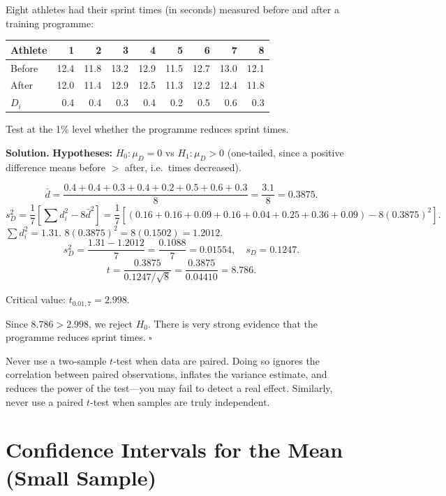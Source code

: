 \documentclass[12pt, a4paper, oneside]{book}
\theoremstyle{definition}
\theoremstyle{plain}
\theoremstyle{remark}
\newenvironment{solution}
  {\par\medskip\noindent\textbf{Solution.}\quad}
  {\hfill$\square$\par\medskip}
\begin{document}
\begin{workedexample}
Eight athletes had their sprint times (in seconds) measured before and after
a training programme:
\begin{center}
\begin{tabular}{lrrrrrrrr}
\toprule
Athlete & 1 & 2 & 3 & 4 & 5 & 6 & 7 & 8 \\
\midrule
Before  & 12.4 & 11.8 & 13.2 & 12.9 & 11.5 & 12.7 & 13.0 & 12.1 \\
After   & 12.0 & 11.4 & 12.9 & 12.5 & 11.3 & 12.2 & 12.4 & 11.8 \\
$D_i$   & 0.4  & 0.4  & 0.3  & 0.4  & 0.2  & 0.5  & 0.6  & 0.3  \\
\bottomrule
\end{tabular}
\end{center}
Test at the 1\% level whether the programme reduces sprint times.

\begin{solution}
\textbf{Hypotheses:} $H_0:\mu_D=0$ vs $H_1:\mu_D>0$ (one-tailed, since a
positive difference means before $>$ after, i.e.\ times decreased).

\[
  \bar{d} = \frac{0.4+0.4+0.3+0.4+0.2+0.5+0.6+0.3}{8} = \frac{3.1}{8} = 0.3875.
\]
\[
  s_D^2 = \frac{1}{7}\left[\sum d_i^2 - 8\bar{d}^2\right]
  = \frac{1}{7}\left[(0.16+0.16+0.09+0.16+0.04+0.25+0.36+0.09) - 8(0.3875)^2\right].
\]
$\sum d_i^2 = 1.31$.  $8(0.3875)^2 = 8(0.1502) = 1.2012$.
\[
  s_D^2 = \frac{1.31-1.2012}{7} = \frac{0.1088}{7} = 0.01554,\quad s_D=0.1247.
\]
\[
  t = \frac{0.3875}{0.1247/\sqrt{8}} = \frac{0.3875}{0.04410} = 8.786.
\]

Critical value: $t_{0.01,7}=2.998$.

Since $8.786 > 2.998$, we reject $H_0$.  There is very strong evidence that
the programme reduces sprint times.
\end{solution}
\end{workedexample}

\begin{warningbox}
Never use a two-sample $t$-test when data are paired.  Doing so ignores the
correlation between paired observations, inflates the variance estimate, and
reduces the power of the test---you may fail to detect a real effect.
Similarly, never use a paired $t$-test when samples are truly independent.
\end{warningbox}

\section{Confidence Intervals for the Mean (Small Sample)}
\label{sec:ci-mean}
\end{document}
